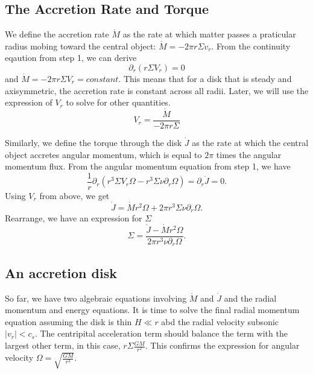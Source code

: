 \documentclass{article}
\begin{document}
\subsection{The Accretion Rate and Torque}
We define the accretion rate $\dot M$ as the rate at which matter passes a praticular radius mobing
toward the central object: $\dot M = -2 \pi r \Sigma v_r$. From the continuity eqaution from step 1, we can derive 
\begin{equation}
    \partial_r (r\Sigma V_r) = 0
\end{equation}
and $\dot M = -2 \pi r \Sigma V_r = \textit{constant}$. This means that for a disk that is
steady and axisymmetric, the accretion rate is constant across all radii.
Later, we will use the expression of $V_r$ to solve for other quantities.
\begin{equation}
    V_r = \frac{\dot M}{-2\pi r \Sigma}
\end{equation}

Similarly, we define the torque through the disk $\dot J$ as the rate at which the central object accretes
angular momentum, which is equal to $2\pi$ times the angular momentum flux. 
From the angular momentum equation from step 1, we have
\begin{equation}
    \frac{1}{r} \partial _r (r^3 \Sigma V_r \Omega - r^3 \Sigma \nu \partial_r \Omega) = \partial_r \dot J = 0. 
\end{equation}
Using $V_r$ from above, we get 
\begin{equation}
    \dot J = \dot M r^2 \Omega + 2\pi r^3 \Sigma \nu \partial_r \Omega.
\end{equation}
Rearrange, we have an expression for $\Sigma$
\begin{equation}
    \Sigma = \frac{\dot J - \dot M r^2 \Omega}{2\pi r^3 \nu \partial_r \Omega}.
\end{equation}

\subsection{An accretion disk}

So far, we have two algebraic equations involving $\dot M$ and $\dot J$ and the radial momentum and energy equations. 
It is time to solve the final radial momentum equation assuming the disk is thin $H \ll r$ abd the radial velocity
subsonic $|v_r| < c_s$. The centripital acceleration term should balance the term with the largest other term, in this case, 
$r\Sigma \frac{GM}{r^2}$. This confirms the expression for angular velocity $\Omega = \sqrt{\frac{GM}{r^3}}$.
\end{document}
